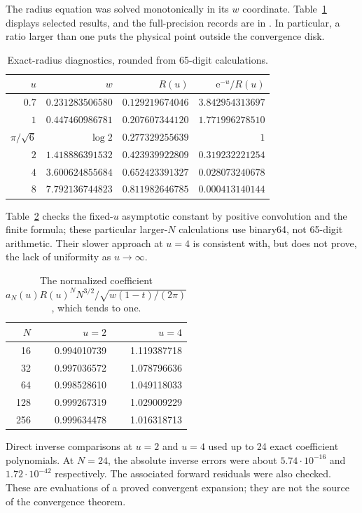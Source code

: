 \documentclass[11pt,a4paper]{article}
\theoremstyle{definition}\newtheorem{definition}[theorem]{Definition}
\theoremstyle{remark}\newtheorem{remark}[theorem]{Remark}
\newcommand{\ee}{\mathrm e}
\numberwithin{equation}{section}
\begin{document}
The radius equation was solved monotonically in its $w$ coordinate.
Table~\ref{tab:radius} displays selected results, and the full-precision
records are in . In particular, a ratio larger than one
puts the physical point outside the convergence disk.
\begin{table}[htbp]\centering
\caption{Exact-radius diagnostics, rounded from 65-digit calculations.}
\label{tab:radius}
\begin{tabular}{rrrr}\toprule
$u$ & $w$ & $R(u)$ & $\ee^{-u}/R(u)$\\\midrule
$0.7$ & $0.231283506580$ & $0.129219674046$ & $3.842954313697$\\
$1$ & $0.447460986781$ & $0.207607344120$ & $1.771996278510$\\
$\pi/\sqrt6$ & $\log2$ & $0.277329255639$ & $1$\\
$2$ & $1.418886391532$ & $0.423939922809$ & $0.319232221254$\\
$4$ & $3.600624855684$ & $0.652423391327$ & $0.028073240678$\\
$8$ & $7.792136744823$ & $0.811982646785$ & $0.000413140144$\\\bottomrule
\end{tabular}
\end{table}

Table~\ref{tab:coeff-limit} checks the fixed-$u$ asymptotic constant by
positive convolution and the finite formula; these particular larger-$N$
calculations use binary64, not 65-digit arithmetic. Their slower approach
at $u=4$ is consistent with, but does not prove, the lack of uniformity
as $u\to\infty$.
\begin{table}[htbp]\centering
\caption{The normalized coefficient
$a_N(u)R(u)^NN^{3/2}/\sqrt{w(1-t)/(2\pi)}$, which tends to one.}
\label{tab:coeff-limit}
\begin{tabular}{rrr}\toprule
$N$ & $u=2$ & $u=4$\\\midrule
16 & 0.994010739 & 1.119387718\\
32 & 0.997036572 & 1.078796636\\
64 & 0.998528610 & 1.049118033\\
128 & 0.999267319 & 1.029009229\\
256 & 0.999634478 & 1.016318713\\\bottomrule
\end{tabular}
\end{table}

Direct inverse comparisons at $u=2$ and $u=4$ used up to 24 exact
coefficient polynomials. At $N=24$, the absolute inverse errors were about
$5.74\cdot10^{-16}$ and $1.72\cdot10^{-42}$ respectively. The associated
forward residuals were also checked. These are evaluations of a proved
convergent expansion; they are not the source of the convergence theorem.
\end{document}
